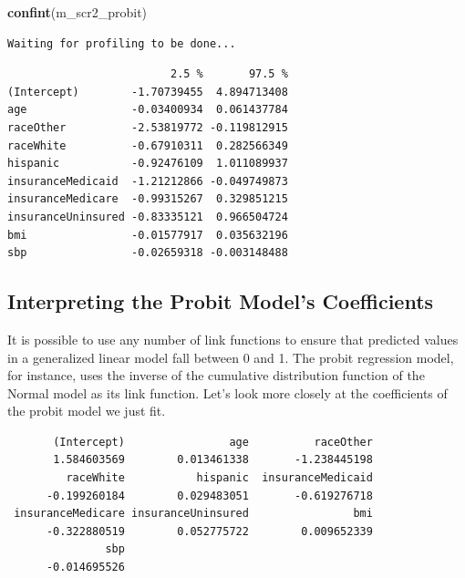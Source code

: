 \documentclass[]{book}
\newenvironment{Shaded}{\begin{snugshade}}{\end{snugshade}}
\newcommand{\KeywordTok}[1]{\textcolor[rgb]{0.13,0.29,0.53}{\textbf{#1}}}
\newcommand{\OperatorTok}[1]{\textcolor[rgb]{0.81,0.36,0.00}{\textbf{#1}}}
\newcommand{\NormalTok}[1]{#1}
\theoremstyle{definition}
\theoremstyle{definition}
\theoremstyle{definition}
\theoremstyle{remark}
\begin{document}
\begin{Shaded}
\begin{Highlighting}[]
\KeywordTok{confint}\NormalTok{(m_scr2_probit)}
\end{Highlighting}
\end{Shaded}

\begin{verbatim}
Waiting for profiling to be done...
\end{verbatim}

\begin{verbatim}
                         2.5 %       97.5 %
(Intercept)        -1.70739455  4.894713408
age                -0.03400934  0.061437784
raceOther          -2.53819772 -0.119812915
raceWhite          -0.67910311  0.282566349
hispanic           -0.92476109  1.011089937
insuranceMedicaid  -1.21212866 -0.049749873
insuranceMedicare  -0.99315267  0.329851215
insuranceUninsured -0.83335121  0.966504724
bmi                -0.01577917  0.035632196
sbp                -0.02659318 -0.003148488
\end{verbatim}

\subsection{Interpreting the Probit Model's
Coefficients}\label{interpreting-the-probit-models-coefficients}

It is possible to use any number of link functions to ensure that
predicted values in a generalized linear model fall between 0 and 1. The
probit regression model, for instance, uses the inverse of the
cumulative distribution function of the Normal model as its link
function. Let's look more closely at the coefficients of the probit
model we just fit.

\begin{Shaded}
\end{Shaded}

\begin{verbatim}
       (Intercept)                age          raceOther 
       1.584603569        0.013461338       -1.238445198 
         raceWhite           hispanic  insuranceMedicaid 
      -0.199260184        0.029483051       -0.619276718 
 insuranceMedicare insuranceUninsured                bmi 
      -0.322880519        0.052775722        0.009652339 
               sbp 
      -0.014695526 
\end{verbatim}
\end{document}
